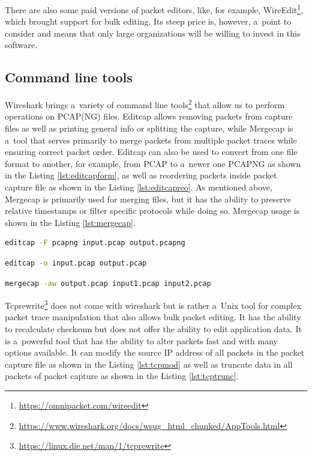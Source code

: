 \documentclass[
  printed,     %
  color,       %
  oneside,     %
  nosansbold,  %
  nocolorbold, %
  nolof,         %
  nolot,         %
]{fithesis4}
\begin{document}
There are also some paid versions of packet editors, like, for example, WireEdit\footnote{\url{https://omnipacket.com/wireedit}}, which brought support for bulk editing. Its steep price is, however, a~point to consider and means that only large organizations will be willing to invest in this software.

\newpage

\subsection{Command line tools}

Wireshark brings a~variety of command line tools\footnote{\url{https://www.wireshark.org/docs/wsug_html_chunked/AppTools.html}} that allow us to perform operations on PCAP(NG) files. Editcap allows removing packets from capture files as well as printing general info or splitting the capture, while Mergecap is a~tool that serves primarily to merge packets from multiple packet traces while ensuring correct packet order. Editcap can also be used to convert from one file format to another, for example, from PCAP to a~newer one PCAPNG as shown in the Listing \ref{lst:editcapform}, as well as reordering packets inside packet capture file as shown in the Listing \ref{lst:editcapreo}. As mentioned above, Mergecap is primarily used for merging files, but it has the ability to preserve relative timestamps or filter specific protocols while doing so. Mergecap usage is shown in the Listing \ref{lst:mergecap}.

\begin{lstlisting}[language=bash, caption={Changing the file format of capture file}, label={lst:editcapform}]
editcap -F pcapng input.pcap output.pcapng
\end{lstlisting}

\newpage

\begin{lstlisting}[language=bash, caption={Reorder packets inside a~capture file}, label={lst:editcapreo}]
editcap -o input.pcap output.pcap
\end{lstlisting}

\begin{lstlisting}[language=bash, caption={Merging capture files and preserving timestamps}, label={lst:mergecap}]
mergecap -aw output.pcap input1.pcap input2.pcap
\end{lstlisting}

Tcprewrite\footnote{\url{https://linux.die.net/man/1/tcprewrite}} does not come with wireshark but is rather a~Unix tool for complex packet trace manipulation that also allows bulk packet editing. It has the ability to recalculate checksum but does not offer the ability to edit application data. It is a~powerful tool that has the ability to alter packets fast and with many options available. It can modify the source IP address of all packets in the packet capture file as shown in the Listing \ref{lst:tcpmod} as well as truncate data in all packets of packet capture as shown in the Listing \ref{lst:tcptrunc}.
\end{document}
